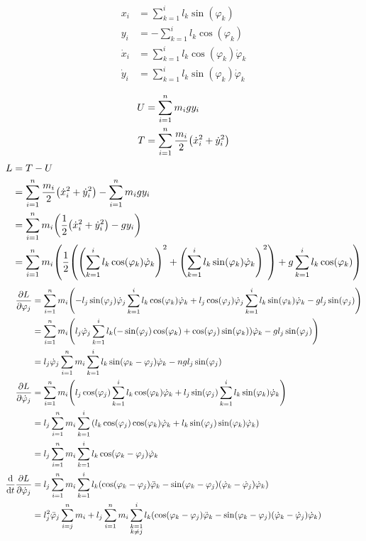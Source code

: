 \documentclass{article}
\renewcommand{\phi}{\varphi}
\begin{document}
\begin{align*}
  x_i &= \sum_{k=1}^i l_k \sin(\phi_k) \\
  y_i &= - \sum_{k=1}^i l_k \cos(\phi_k) \\
  \dot x_i &= \sum_{k=1}^i l_k \cos(\phi_k) \dot\phi_k \\
  \dot y_i &= \sum_{k=1}^i l_k \sin(\phi_k) \dot\phi_k \\
\end{align*}
\begin{align*}
  U &= \sum_{i=1}^n m_i g y_i \\
  T &= \sum_{i=1}^n \frac{m_i}{2} \pqty{\dot x_i^2 + \dot y_i^2} \\
\end{align*}
\begin{align*}
  L &= T - U \\
    &= \sum_{i=1}^n \frac{m_i}{2} \pqty{\dot x_i^2 + \dot y_i^2} - \sum_{i=1}^n m_i g y_i \\
    &= \sum_{i=1}^n m_i \pqty{\frac{1}{2} \pqty{\dot x_i^2 + \dot y_i^2} - g y_i} \\
    &= \sum_{i=1}^n m_i \pqty{\frac{1}{2} \pqty{{\pqty{\sum_{k=1}^i l_k \cos(\phi_k) \dot\phi_k}}^2 + {\pqty{\sum_{k=1}^i l_k \sin(\phi_k) \dot\phi_k}}^2} + g \sum_{k=1}^i l_k \cos(\phi_k)} \\
\end{align*}
\begin{align*}
  \pdv{L}{\phi_j} &= \sum_{i=1}^n m_i \pqty{-l_j \sin(\phi_j) \dot\phi_j \sum_{k=1}^i l_k \cos(\phi_k) \dot\phi_k + l_j \cos(\phi_j) \dot\phi_j \sum_{k=1}^i l_k \sin(\phi_k) \dot\phi_k - g l_j \sin(\phi_j)} \\
                  &= \sum_{i=1}^n m_i \pqty{l_j \dot\phi_j \sum_{k=1}^i l_k \pqty{-\sin(\phi_j) \cos(\phi_k) + \cos(\phi_j) \sin(\phi_k)} \dot\phi_k - g l_j \sin(\phi_j)} \\
                  &= l_j \dot\phi_j \sum_{i=1}^n m_i \sum_{k=1}^i l_k \sin(\phi_k - \phi_j) \dot\phi_k - n g l_j \sin(\phi_j) \\
  \pdv{L}{\dot\phi_j} &= \sum_{i=1}^n m_i \pqty{l_j \cos(\phi_j) \sum_{k=1}^i l_k \cos(\phi_k) \dot\phi_k + l_j \sin(\phi_j) \sum_{k=1}^i l_k \sin(\phi_k) \dot\phi_k} \\
                      &= l_j \sum_{i=1}^n m_i \sum_{k=1}^i \pqty{l_k \cos(\phi_j) \cos(\phi_k) \dot\phi_k + l_k \sin(\phi_j) \sin(\phi_k) \dot\phi_k} \\
                      &= l_j \sum_{i=1}^n m_i \sum_{k=1}^i l_k \cos(\phi_k - \phi_j) \dot\phi_k \\
  \dv{t} \pdv{L}{\dot\phi_j} &= l_j \sum_{i=1}^n m_i \sum_{k=1}^i l_k \pqty{\cos(\phi_k - \phi_j) \ddot\phi_k - \sin(\phi_k - \phi_j)(\dot\phi_k - \dot\phi_j)\dot\phi_k} \\
                             &= l_j^2 \ddot\phi_j \sum_{i=j}^n m_i + l_j \sum_{i=1}^n m_i \sum_{\substack{k=1\\k \neq j}}^i l_k \pqty{\cos(\phi_k - \phi_j) \ddot\phi_k - \sin(\phi_k - \phi_j)(\dot\phi_k - \dot\phi_j)\dot\phi_k} \\
\end{align*}
\end{document}
